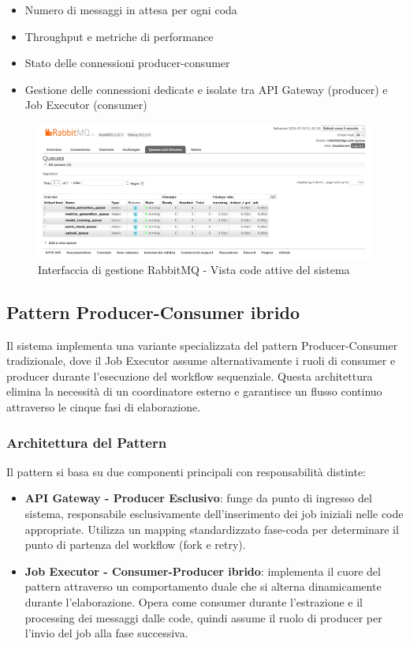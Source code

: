 \begin{itemize}
	\item Numero di messaggi in attesa per ogni coda
	\item Throughput e metriche di performance
	\item Stato delle connessioni producer-consumer
	\item Gestione delle connessioni dedicate e isolate tra API Gateway (producer) e Job Executor (consumer)
\end{itemize}

\begin{figure}[h]
	\centering
	\includegraphics[width=\textwidth]{images/rabbitmq_queues_interface.jpg}
	\caption{Interfaccia di gestione RabbitMQ - Vista code attive del sistema}
	\label{fig:rabbitmq_queues}
\end{figure}

\subsection{Pattern Producer-Consumer ibrido}

Il sistema implementa una variante specializzata del pattern Producer-Consumer tradizionale, dove il Job Executor assume alternativamente i ruoli di consumer e producer durante l'esecuzione del workflow sequenziale. Questa architettura elimina la necessità di un coordinatore esterno e garantisce un flusso continuo attraverso le cinque fasi di elaborazione.

\subsubsection{Architettura del Pattern}

Il pattern si basa su due componenti principali con responsabilità distinte:

\begin{itemize}
	\item \textbf{API Gateway - Producer Esclusivo}: funge da punto di ingresso del sistema, responsabile esclusivamente dell'inserimento dei job iniziali nelle code appropriate. Utilizza un mapping standardizzato fase-coda per determinare il punto di partenza del workflow (fork e retry).
	
	\item \textbf{Job Executor - Consumer-Producer ibrido}: implementa il cuore del pattern attraverso un comportamento duale che si alterna dinamicamente durante l'elaborazione. Opera come consumer durante l'estrazione e il processing dei messaggi dalle code, quindi assume il ruolo di producer per l'invio del job alla fase successiva.
\end{itemize}

